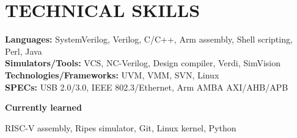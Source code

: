 \documentclass[letterpaper,11pt]{article}
\begin{document}
\section{TECHNICAL SKILLS}
 \begin{itemize}[leftmargin=0.15in, label={}]
    \small{\item{
     \textbf{\normalsize{Languages:}}{ \normalsize{SystemVerilog, Verilog, C/C++, Arm assembly, Shell scripting, Perl, Java}} \\
     \textbf{\normalsize{Simulators/Tools:}}{ \normalsize{VCS, NC-Verilog, Design compiler, Verdi, SimVision}} \\
     \textbf{\normalsize{Technologies/Frameworks:}}{ \normalsize{UVM, VMM, SVN, Linux}} \\
     \textbf{\normalsize{SPECs:}}{ \normalsize{USB 2.0/3.0, IEEE 802.3/Ethernet, Arm AMBA AXI/AHB/APB}} \\
    }}
 \end{itemize}
 \vspace{-4pt}
 {{\textbf{\large{Currently learned}}}}
 \vspace{-4pt}
  \begin{itemize}[leftmargin=0.15in, label={}]
    \small{\item{
     {\normalsize{RISC-V assembly, Ripes simulator, Git, Linux kernel, Python}}
    }}
 \end{itemize}
 \vspace{-14pt}
 

\end{document}
